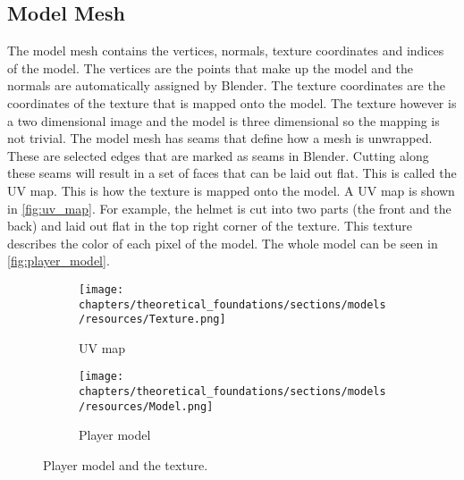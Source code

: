 \subsection{Model Mesh} \label{sec:theory_theory_models_mesh}
The model mesh contains the vertices, normals, texture coordinates and indices of the model.
The vertices are the points that make up the model and the normals are automatically assigned by Blender.
The texture coordinates are the coordinates of the texture that is mapped onto the model.
The texture however is a two dimensional image and the model is three dimensional so the mapping is not trivial.
The model mesh has seams that define how a mesh is unwrapped.
These are selected edges that are marked as seams in Blender.
Cutting along these seams will result in a set of faces that can be laid out flat.
This is called the UV map.
This is how the texture is mapped onto the model.
A UV map is shown in \autoref{fig:uv_map}.
For example, the helmet is cut into two parts (the front and the back) and laid out flat in the top right corner of the texture.
This texture describes the color of each pixel of the model.
The whole model can be seen in \autoref{fig:player_model}.

\begin{figure}[h]
    \centering
    \begin{subfigure}{0.45\textwidth}
        \centering
        \texttt{[image: chapters/theoretical\_foundations/sections/models/resources/Texture.png]}
        \caption{UV map}
        \label{fig:uv_map}
    \end{subfigure}
    \hfill
    \begin{subfigure}{0.45\textwidth}
        \centering
        \texttt{[image: chapters/theoretical\_foundations/sections/models/resources/Model.png]}
        \caption{Player model}
        \label{fig:player_model}
    \end{subfigure}

    \caption{Player model and the texture.}
\end{figure}
